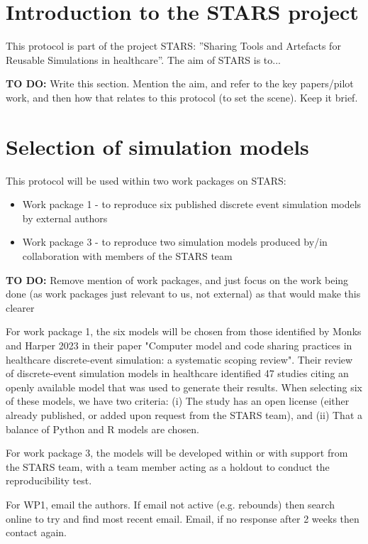 \section{Introduction to the STARS project}

This protocol is part of the project STARS: ”Sharing Tools and Artefacts for Reusable Simulations in healthcare”. The aim of STARS is to...

\textbf{TO DO:} Write this section. Mention the aim, and refer to the key papers/pilot work, and then how that relates to this protocol (to set the scene). Keep it brief.

\autocite{monks_towards_2024}

\section{Selection of simulation models}

This protocol will be used within two work packages on STARS:
\begin{itemize}
    \item Work package 1 - to reproduce six published discrete event simulation models by external authors
    \item Work package 3 - to reproduce two simulation models produced by/in collaboration with members of the STARS team
\end{itemize}

\textbf{TO DO:} Remove mention of work packages, and just focus on the work being done (as work packages just relevant to us, not external) as that would make this clearer

For work package 1, the six models will be chosen from those identified by Monks and Harper 2023\autocite{monks_computer_2023} in their paper "Computer model and code sharing practices in healthcare discrete-event simulation: a systematic scoping review". Their review of discrete-event simulation models in healthcare identified 47 studies citing an openly available model that was used to generate their results. When selecting six of these models, we have two criteria: (i) The study has an open license (either already published, or added upon request from the STARS team), and (ii) That a balance of Python and R models are chosen.

For work package 3, the models will be developed within or with support from the STARS team, with a team member acting as a holdout to conduct the reproducibility test.

For WP1, email the authors. If email not active (e.g. rebounds) then search online to try and find most recent email. Email, if no response after 2 weeks then contact again.

